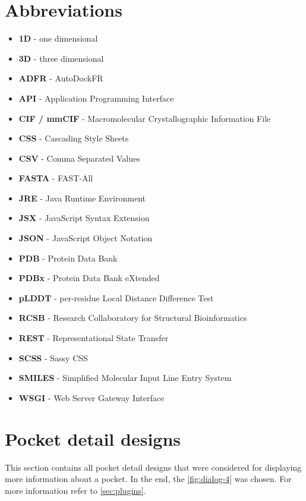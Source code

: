 \section{Abbreviations}
\label{sec:abbreviations}
\begin{itemize}
    \item \textbf{1D} - one dimensional
    \item \textbf{3D} - three dimensional
    \item \textbf{ADFR} - AutoDockFR
    \item \textbf{API} - Application Programming Interface
    \item \textbf{CIF / mmCIF} - Macromolecular Crystallographic Information File
    \item \textbf{CSS} - Cascading Style Sheets
    \item \textbf{CSV} - Comma Separated Values
    \item \textbf{FASTA} - FAST-All
    \item \textbf{JRE} - Java Runtime Environment
    \item \textbf{JSX} - JavaScript Syntax Extension
    \item \textbf{JSON} - JavaScript Object Notation
    \item \textbf{PDB} - Protein Data Bank
    \item \textbf{PDBx} - Protein Data Bank eXtended
    \item \textbf{pLDDT} - per-residue Local Distance Difference Test
    \item \textbf{RCSB} - Research Collaboratory for Structural Bioinformatics
    \item \textbf{REST} - Representational State Transfer
    \item \textbf{SCSS} - Sassy CSS
    \item \textbf{SMILES} - Simplified Molecular Input Line Entry System
    \item \textbf{WSGI} - Web Server Gateway Interface
\end{itemize}


\section{Pocket detail designs}
\label{sec:pocket_detail_designs}

This section contains all pocket detail designs that were considered for displaying more information about a pocket. In the end, the \cref{fig:dialog-4} was chosen. For more information refer to \cref{sec:plugins}.

